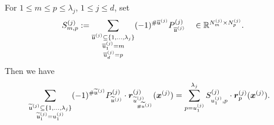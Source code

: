 \documentclass[	a4paper, 
								11pt]{article}
\theoremstyle{plain}
\begin{document}
\begin{corollary}\label{cor:InnermostSum}
For $ 1 \leq m \leq p \leq \lambda_j $, $ 1 \leq j \leq d $, set 
\begin{align}\label{eq:SumMatrix}
S^{(j)}_{m,p} := \sum_{\substack{\overline{\mathfrak{u}}^{(j)} 
\subseteq \{1, \dots, \lambda_j\} \\ \overline{u}^{(j)}_1 = m \\
\overline{u}^{(j)}_d = p}} (-1)^{\# \overline{\mathfrak{u}}^{(j)}} P^{(j)}_
{\overline{\mathfrak{u}}^{(j)}} \quad \in \mathbb{R}^{N^{(j)}_m \times N^{(j)}_p}.
\end{align}
Then we have
\begin{align}\label{eq:InnermostSum}
 &\sum_{\substack{ \widetilde{\mathfrak{u}}^{(j)} \subseteq \{1,\dots,\lambda_j\} \\ 
 \widetilde{\mathfrak{u}}^{(j)}_1 = u_1^{(j)}}} (-1)^{\# \widetilde{
 \mathfrak{u}}^{(j)}}  P^{(j)}_{\widetilde{\mathfrak{u}}^{(j)}} \cdot \boldsymbol{r}^{(j)}
 _{\widetilde{u}^{(j)}_{\# \widetilde{\mathfrak{u}}^{(j)}}} ( \boldsymbol{x}^{(j)}) = 
\sum_{p = u_1^{(j)}}^{\lambda_j} S^{(j)}_{u_1^{(j)}, p} \cdot \boldsymbol{r}^{(j)}_{p}
  (\boldsymbol{x}^{(j)}).
\end{align}
\end{corollary}
\end{document}

